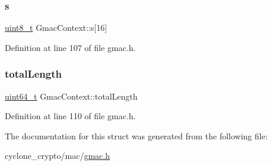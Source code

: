 \subsubsection{\texorpdfstring{s}{s}}
{\footnotesize\ttfamily \hyperlink{stdint_8h_aba7bc1797add20fe3efdf37ced1182c5}{uint8\+\_\+t} Gmac\+Context\+::s\mbox{[}16\mbox{]}}



Definition at line 107 of file gmac.\+h.

\mbox{\label{structGmacContext_aefe7162a28878d28b4298b87d1e69922}} 
\subsubsection{\texorpdfstring{total\+Length}{totalLength}}
{\footnotesize\ttfamily \hyperlink{stdint_8h_aec6fcb673ff035718c238c8c9d544c47}{uint64\+\_\+t} Gmac\+Context\+::total\+Length}



Definition at line 110 of file gmac.\+h.



The documentation for this struct was generated from the following file\+:\begin{DoxyCompactItemize}
\item 
cyclone\+\_\+crypto/mac/\hyperlink{gmac_8h}{gmac.\+h}\end{DoxyCompactItemize}
